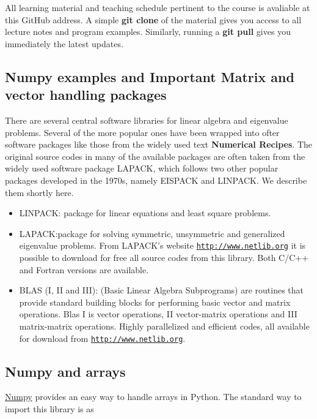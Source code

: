 \documentclass[%
oneside,                 %
final,                   %
10pt]{article}
\begin{document}
\noindent
All learning material and teaching schedule pertinent to the course is
avaliable at this GitHub address. A simple \textbf{git clone} of the material
gives you access to all lecture notes and program examples. Similarly,
running a \textbf{git pull} gives you immediately the latest updates.

\subsection*{Numpy examples and Important Matrix and vector handling packages}

There are several central software libraries for linear algebra and eigenvalue problems. Several of the more
popular ones have been wrapped into ofter software packages like those from the widely used text \textbf{Numerical Recipes}. The original source codes in many of the available packages are often taken from the widely used
software package LAPACK, which follows two other popular packages
developed in the 1970s, namely EISPACK and LINPACK.  We describe them shortly here.

\begin{itemize}
  \item LINPACK: package for linear equations and least square problems.

  \item LAPACK:package for solving symmetric, unsymmetric and generalized eigenvalue problems. From LAPACK's website \href{{http://www.netlib.org}}{\nolinkurl{http://www.netlib.org}} it is possible to download for free all source codes from this library. Both C/C++ and Fortran versions are available.

  \item BLAS (I, II and III): (Basic Linear Algebra Subprograms) are routines that provide standard building blocks for performing basic vector and matrix operations. Blas I is vector operations, II vector-matrix operations and III matrix-matrix operations. Highly parallelized and efficient codes, all available for download from \href{{http://www.netlib.org}}{\nolinkurl{http://www.netlib.org}}.
\end{itemize}

\noindent
\subsection*{Numpy and arrays}
\href{{http://www.numpy.org/}}{Numpy} provides an easy way to handle arrays in Python. The standard way to import this library is as
\end{document}
